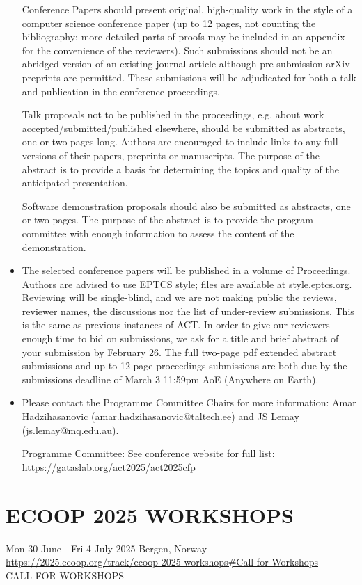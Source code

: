 \documentclass[prodmode,acmtecs]{acmsmall} %
\begin{document}
\begin{itemize}
  Conference Papers should present original, high-quality work in the style of a computer science conference paper (up to 12 pages, not counting the bibliography; more detailed parts of proofs may be included in an appendix for the convenience of the reviewers). Such submissions should not be an abridged version of an existing journal article although pre-submission arXiv preprints are permitted. These submissions will be adjudicated for both a talk and publication in the conference proceedings. 
 
  Talk proposals not to be published in the proceedings, e.g. about work accepted/submitted/published elsewhere, should be submitted as abstracts, one or two pages long. Authors are encouraged to include links to any full versions of their papers, preprints or manuscripts. The purpose of the abstract is to provide a basis for determining the topics and quality of the anticipated presentation. 
 
  Software demonstration proposals should also be submitted as abstracts, one or two pages. The purpose of the abstract is to provide the program committee with enough information to assess the content of the demonstration. 
 
\item  The selected conference papers will be published in a volume of Proceedings. Authors are advised to use EPTCS style; files are available at style.eptcs.org. Reviewing will be single-blind, and we are not making public the reviews, reviewer names, the discussions nor the list of under-review submissions. This is the same as previous instances of ACT. In order to give our reviewers enough time to bid on submissions, we ask for a title and brief abstract of your submission by February 26. The full two-page pdf extended abstract submissions and up to 12 page proceedings submissions are both due by the submissions deadline of March 3 11:59pm AoE (Anywhere on Earth). 
 
\item  Please contact the Programme Committee Chairs for more information: Amar Hadzihasanovic (amar.hadzihasanovic@taltech.ee) and JS Lemay (js.lemay@mq.edu.au). 
 
  Programme Committee: See conference website for full list: \href{https://gataslab.org/act2025/act2025cfp}{https://gataslab.org/act2025/act2025cfp} 
 
\end{itemize}\section{ECOOP 2025 WORKSHOPS}\label{ECOOP2025WORKSHOPS}  Mon 30 June - Fri 4 July 2025 Bergen, Norway\\ 
  \href{https://2025.ecoop.org/track/ecoop-2025-workshops#Call-for-Workshops}{https://2025.ecoop.org/track/ecoop-2025-workshops\#Call-for-Workshops}\\ 
CALL FOR WORKSHOPS 
\end{document}
